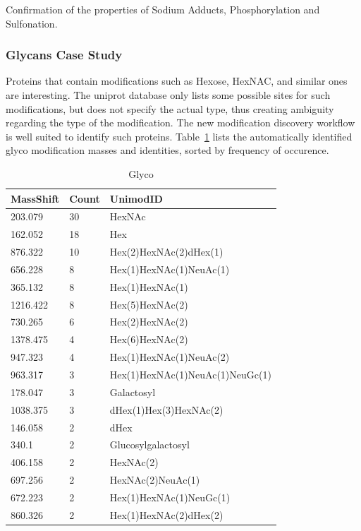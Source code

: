 \documentclass[journal=jprobs,manuscript=article]{achemso}
\begin{document}
Confirmation of the properties of Sodium Adducts, Phosphorylation and Sulfonation.
\subsubsection{Glycans Case Study}
Proteins that contain modifications such as Hexose, HexNAC, and similar ones are interesting. The uniprot database only lists some possible sites for such modifications, but does not specify the actual type, thus creating ambiguity regarding the type of the modification. The new modification discovery workflow is well suited to identify such proteins. Table~\ref{tbl:glyco} lists the automatically identified glyco modification masses and identities, sorted by frequency of occurence. 

\begin{table}[]
\centering
\caption{Glyco}
\label{tbl:glyco}
\begin{tabular}{lll}
MassShift & Count & UnimodID                        \\
\hline
203.079   & 30    & HexNAc                          \\
162.052   & 18    & Hex                             \\
876.322   & 10    & Hex(2)HexNAc(2)dHex(1)          \\
656.228   & 8     & Hex(1)HexNAc(1)NeuAc(1)         \\
365.132   & 8     & Hex(1)HexNAc(1)                 \\
1216.422  & 8     & Hex(5)HexNAc(2)                 \\
730.265   & 6     & Hex(2)HexNAc(2)                 \\
1378.475  & 4     & Hex(6)HexNAc(2)                 \\
947.323   & 4     & Hex(1)HexNAc(1)NeuAc(2)         \\
963.317   & 3     & Hex(1)HexNAc(1)NeuAc(1)NeuGc(1) \\
178.047   & 3     & Galactosyl                      \\
1038.375  & 3     & dHex(1)Hex(3)HexNAc(2)          \\
146.058   & 2     & dHex                            \\
340.1     & 2     & Glucosylgalactosyl              \\
406.158   & 2     & HexNAc(2)                       \\
697.256   & 2     & HexNAc(2)NeuAc(1)               \\
672.223   & 2     & Hex(1)HexNAc(1)NeuGc(1)         \\
860.326   & 2     & Hex(1)HexNAc(2)dHex(2)         
\end{tabular}
\end{table}
\end{document}

